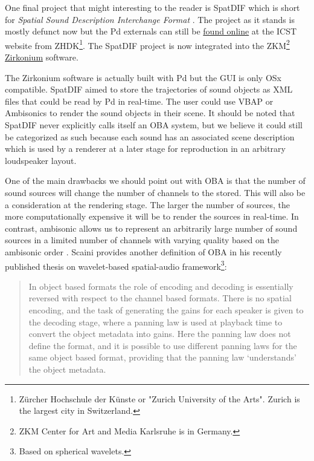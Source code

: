 One final project that might interesting to the reader is SpatDIF which is short for \textit{Spatial Sound Description Interchange Format} \cite{peters2012spatdif}. The project as it stands is mostly defunct now but the Pd externals can still be \href{https://www.zhdk.ch/en/research/icst}{found online} at the ICST website from ZHDK\footnote{Zürcher Hochschule der Künste or "Zurich University of the Arts". Zurich is the largest city in Switzerland.}. The SpatDIF project is now integrated into the ZKM\footnote{ZKM Center for Art and Media Karlsruhe is in Germany.} \href{https://zkm.de/en/about-the-zkm/organization/hertz-lab/software/zirkonium}{Zirkonium} software. 

The Zirkonium software is actually built with Pd but the GUI is only OSx compatible. SpatDIF aimed to store the trajectories of sound objects as XML files that could be read by Pd in real-time. The user could use VBAP or Ambisonics to render the sound objects in their scene. It should be noted that SpatDIF never explicitly calls itself an OBA system, but we believe it could still be categorized as such because each sound has an associated scene description which is used by a renderer at a later stage for reproduction in an arbitrary loudspeaker layout. 

One of the main drawbacks we should point out with OBA is that the number of sound sources will change the number of channels to the stored. This will also be a consideration at the rendering stage. The larger the number of sources, the more computationally expensive it will be to render the sources in real-time. In contrast, ambisonic allows us to represent an arbitrarily large number of sound sources in a limited number of channels with varying quality based on the ambisonic order \cite{scaini2020wavelet}. Scaini provides another definition of OBA in his recently published thesis on wavelet-based spatial-audio framework\footnote{Based on spherical wavelets.}: 

\begin{quote}
    In object based formats the role of encoding and decoding is essentially reversed with respect to the channel based formats. There is no spatial encoding, and the task of generating the gains for each speaker is given to the decoding stage, where a panning law is used at playback time to convert the object metadata into gains. Here the panning law does not define the format, and it is possible to use different panning laws for the same object based format, providing that the panning law ‘understands’ the object metadata.
\end{quote}

